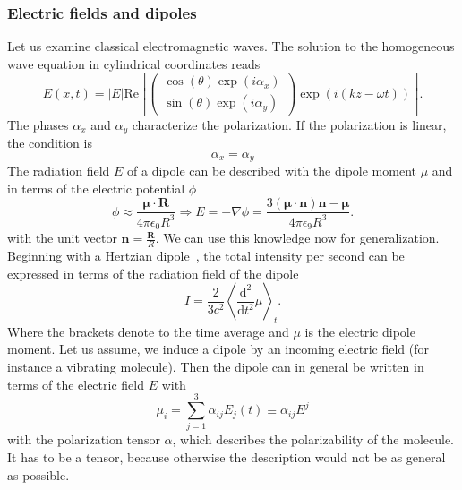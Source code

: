 \subsubsection{Electric fields and dipoles}
\label{ssub:Electricfieldsanddipoles}
Let us examine classical electromagnetic waves. The solution to the homogeneous
wave equation in cylindrical coordinates reads
\begin{equation}
    E(x,t) = |E| \textrm{Re} \left[ \begin{pmatrix}
            \cos(\theta)\exp(i \alpha_x)\\ 
            \sin(\theta)\exp(i \alpha_y)
    \end{pmatrix}\exp(i(kz - \omega t))  \right].
\end{equation}
The phases $\alpha_x$ and $\alpha_y$ characterize the polarization. If the polarization
is linear, the condition is
\begin{equation}
    \alpha_x = \alpha_y 
\end{equation}
The radiation field $E$ of a dipole
can be described with the dipole moment $\mu$ and in terms of the electric potential $\phi$
\begin{equation}
\phi \approx \frac{\mathbold{\mu}\cdot \mathbold{R}}{4\pi\epsilon_0 R^3} \Rightarrow E = - \nabla \phi 
= \frac{3 \mathbold{(\mu \cdot n) n - \mu}}{4 \pi \epsilon_9 R^3}.
\end{equation}
with the unit vector $\textbf{n} = \frac{\textbf{R}}{R}$. We can use this knowledge now for 
generalization.
Beginning with a Hertzian dipole~\cite{koningstein1972introduction}, the total intensity
per second can be expressed in terms of the radiation field of the dipole 
\begin{equation}
    \label{eq:hertz}
   I = \frac{2}{3 c^2} \left \langle \frac{\mathrm{d}^2}{\mathrm{d} t^2}  \mu \right \rangle_t.
\end{equation}
Where the brackets denote to the time average and $\mu$ is the electric dipole moment. Let us assume,
we induce a dipole by an incoming electric field (for instance a vibrating molecule).
Then the dipole can in general be written in terms of the electric field $E$ with
\begin{equation}
    \label{eq:mu}
    \mu_i = \sum^{3}_{j=1} \alpha_{ij} E_j(t) \equiv \alpha_{ij} E^j 
\end{equation}
with the polarization tensor $\alpha$, which describes the polarizability of the molecule.
It has to be a tensor, because otherwise the description would not be as general as possible.
